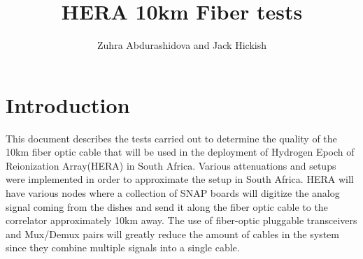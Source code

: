 \documentclass{article}
\begin{document}
\title{HERA 10km Fiber tests}
\author{Zuhra Abdurashidova and Jack Hickish}
\maketitle

\section*{Introduction}
This document describes the tests carried out to determine the quality of the 10km fiber optic cable that will be used in the deployment of Hydrogen Epoch of Reionization Array(HERA) in South Africa. Various attenuations and setups were implemented in order to approximate the setup in South Africa. HERA will have various nodes where a collection of SNAP boards will digitize the analog signal coming from the dishes and send it along the fiber optic cable to the correlator approximately 10km away. The use of fiber-optic pluggable transceivers and Mux/Demux pairs will greatly reduce the amount of cables in the system since they combine multiple signals into a single cable. 
\end{document}
